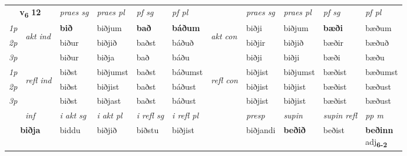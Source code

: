 \noindent
\begin{tabular}{lllllllllll} \toprule
\multicolumn{2}{c}{\textbf{v{\textsubscript{6}}} \Large{\textbf{12}}}  &  \textit{praes sg}  & \textit{praes pl}  &\textit{ pf sg} & \textit{pf pl} &  &  \textit{praes sg}  & \textit{praes pl}  & \textit{pf sg} & \textit{pf pl } \\*
	\cmidrule{3-6} \cmidrule{8-11}
 {\textit{1p}} & \multirow{3}{*}{\begin{turn}{90}\textit{akt ind}\end{turn}} & \textbf{bið} & biðjum & \textbf{bað} & \textbf{báðum} & \multirow{3}{*}{\begin{turn}{90}\textit{akt con}\end{turn}} &biðji & biðjum & \textbf{bæði} & bæðum\\*
 {\textit{2p}} &  &  biður  & biðjið & baðst & báðuð & & biðjir & biðjið & bæðir & bæðuð \\*
{\textit{3p}} &  & biður & biðja & bað & báðu & & biðji & biðji& bæði & bæðu \\*
\cmidrule{3-6} \cmidrule{8-11}
 {\textit{1p}} & \multirow{3}{*}{\begin{turn}{90}\textit{refl ind}\end{turn}}  & biðst & biðjumst & baðst & báðumst & \multirow{3}{*}{\begin{turn}{90}\textit{refl con}\end{turn}}  &biðjist & biðjumst & bæðist & bæðumst \\*
 {\textit{2p}} &  & biðst & biðjist & baðst & báðust & &biðjist & biðjist & bæðist & bæðust \\*
 {\textit{3p}}  & & biðst & biðjast & baðst & báðust & & biðjist & biðjist& bæðist & bæðust \\*
\cmidrule{3-6} \cmidrule{8-11}

   \multicolumn{2}{c}{\textit{inf}}  & \textit{i akt sg} & \textit{i akt pl} & \textit{i refl sg} & \textit{i refl pl} && \textit{presp} & \textit{supin} & \textit{supin refl} & \textit{pp m} \\*
  \multicolumn{2}{c}{\textbf{biðja}} & biddu  & biðjið & biðstu & biðjist && biðjandi &  \textbf{beðið} & beðist & \specialcell{\textbf{beðinn} \\ adj\textbf{\textsubscript{6-2}}} \\*
\end{tabular}

